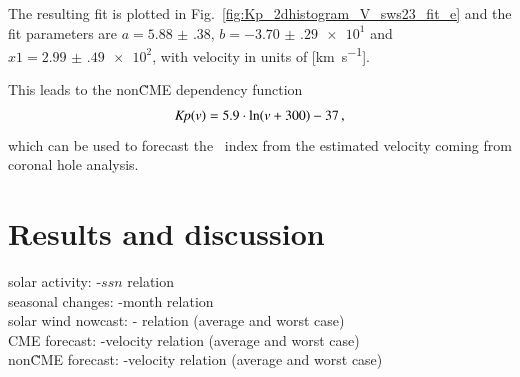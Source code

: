 The resulting fit is plotted in Fig.~\ref{fig:Kp_2dhistogram_V_sws23_fit_e} and the fit parameters are $a = \num{5.88(38)}$, $b = \num{-3.70(29)e1}$ and $x1 = \num{2.99(49)e2}$, with velocity in units of [\si{\km\per\s}].\\
\begin{figure}
\end{figure}
This leads to the non\~CME dependency function
\begin{align}
	\textit{Kp}(v) = 5.9 \cdot \ln(v + 300) - 37	\,,	\label{eq:kpvsv_sws23_dependency_function}
\end{align}
which can be used to forecast the \Kp{}~index from the estimated velocity coming from coronal hole analysis.\\


\section{Results and discussion}
solar activity: \Kp-$ssn$ relation\\
seasonal changes: \Kp{}-month relation\\
solar wind nowcast: \Kp-\vBz{} relation (average and worst case)\\
CME forecast: \Kp-velocity relation (average and worst case)\\
non\~CME forecast: \Kp-velocity relation (average and worst case)\\

